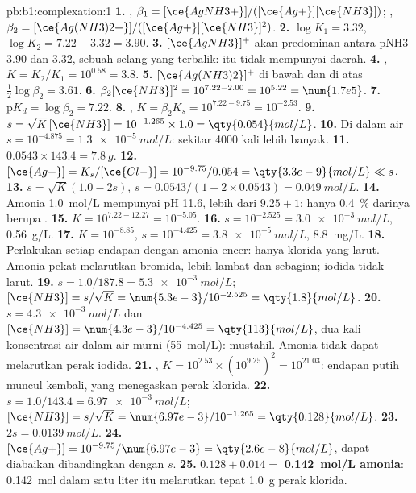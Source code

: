 \begin{solution}{pb:b1:complexation:1}
\textbf{1.} , $\beta_1 = [\ce{AgNH3+}]/([\ce{Ag+}][\ce{NH3}])$;
, $\beta_2 = [\ce{Ag(NH3)2+}]/([\ce{Ag+}][\ce{NH3}]^2)$.
\textbf{2.} $\log K_1 = 3.32$, $\log K_2 = 7.22 - 3.32 = 3.90$.
\textbf{3.} $[\ce{AgNH3}]^{+}$ akan predominan antara pNH3 3.90 dan 3.32,
sebuah selang yang terbalik:  itu tidak mempunyai daerah.
\textbf{4.} , $K = K_2/K_1 = 10^{0.58} =
3.8$.
\textbf{5.} $[\ce{Ag(NH3)2}]^{+}$ di bawah dan  di atas
$\frac12\log\beta_2 = 3.61$.
\textbf{6.} $\beta_2[\ce{NH3}]^2 = 10^{7.22 - 2.00} = 10^{5.22} = \num{1.7e5}$.
\textbf{7.} $\mathrm{p}K_d = \log\beta_2 = 7.22$.
\textbf{8.} , $K = \beta_2K_s =
10^{7.22 - 9.75} = 10^{-2.53}$.
\textbf{9.} $s = \sqrt{K}\,[\ce{NH3}] = 10^{-1.265} \times 1.0 =
\qty{0.054}{mol/L}$.
\textbf{10.} Di dalam air $s = 10^{-4.875} = \qty{1.3e-5}{mol/L}$: sekitar
4000 kali lebih banyak.
\textbf{11.} $0.0543 \times 143.4 = \qty{7.8}{g}$.
\textbf{12.} $[\ce{Ag+}] = K_s/[\ce{Cl-}] = 10^{-9.75}/0.054 =
\qty{3.3e-9}{mol/L} \ll s$.
\textbf{13.} $s = \sqrt{K}(1.0 - 2s)$, $s = 0.0543/(1 + 2 \times 0.0543) =
\qty{0.049}{mol/L}$.
\textbf{14.} Amonia \qty{1.0}{mol/L} mempunyai pH 11.6, lebih dari
$9.25 + 1$: hanya \qty{0.4}{\percent} darinya berupa .
\textbf{15.} $K = 10^{7.22 - 12.27} = 10^{-5.05}$.
\textbf{16.} $s = 10^{-2.525} = \qty{3.0e-3}{mol/L}$, \qty{0.56}{g/L}.
\textbf{17.} $K = 10^{-8.85}$, $s = 10^{-4.425} = \qty{3.8e-5}{mol/L}$,
\qty{8.8}{mg/L}.
\textbf{18.} Perlakukan setiap endapan dengan amonia encer: hanya klorida
yang larut. Amonia pekat melarutkan bromida, lebih lambat dan sebagian;
iodida tidak larut.
\textbf{19.} $s = 1.0/187.8 = \qty{5.3e-3}{mol/L}$; $[\ce{NH3}] = s/\sqrt{K}
= \num{5.3e-3}/10^{-2.525} = \qty{1.8}{mol/L}$.
\textbf{20.} $s = \qty{4.3e-3}{mol/L}$ dan $[\ce{NH3}] = \num{4.3e-3}/10^{-4.425}
= \qty{113}{mol/L}$, dua kali konsentrasi air dalam air murni
(\qty{55}{mol/L}): mustahil. Amonia tidak dapat melarutkan perak iodida.
\textbf{21.} ,
$K = 10^{2.53} \times (10^{9.25})^2 = 10^{21.03}$: endapan putih muncul
kembali, yang menegaskan perak klorida.
\textbf{22.} $s = 1.0/143.4 = \qty{6.97e-3}{mol/L}$; $[\ce{NH3}] =
s/\sqrt{K} = \num{6.97e-3}/10^{-1.265} = \qty{0.128}{mol/L}$.
\textbf{23.} $2s = \qty{0.0139}{mol/L}$.
\textbf{24.} $[\ce{Ag+}] = 10^{-9.75}/\num{6.97e-3} = \qty{2.6e-8}{mol/L}$,
dapat diabaikan dibandingkan dengan $s$.
\textbf{25.} $0.128 + 0.014 = $ \textbf{\qty{0.142}{mol/L} amonia}:
\qty{0.142}{mol} dalam satu liter itu melarutkan tepat \qty{1.0}{g} perak
klorida.
\end{solution}
